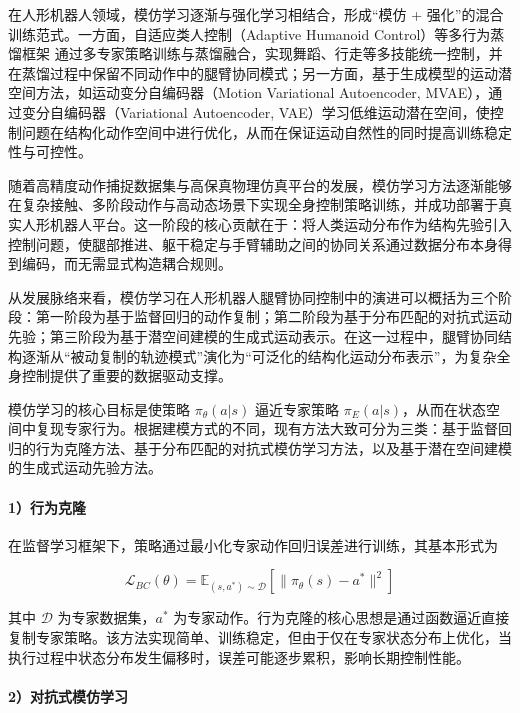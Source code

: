 在人形机器人领域，模仿学习逐渐与强化学习相结合，形成“模仿 + 强化”的混合训练范式。一方面，自适应类人控制（Adaptive Humanoid Control）等多行为蒸馏框架 \cite{MOE} 通过多专家策略训练与蒸馏融合，实现舞蹈、行走等多技能统一控制，并在蒸馏过程中保留不同动作中的腿臂协同模式；另一方面，基于生成模型的运动潜空间方法，如运动变分自编码器（Motion Variational Autoencoder, MVAE）\cite{MVAE}，通过变分自编码器（Variational Autoencoder, VAE）学习低维运动潜在空间，使控制问题在结构化动作空间中进行优化，从而在保证运动自然性的同时提高训练稳定性与可控性。

随着高精度动作捕捉数据集与高保真物理仿真平台的发展，模仿学习方法逐渐能够在复杂接触、多阶段动作与高动态场景下实现全身控制策略训练，并成功部署于真实人形机器人平台。这一阶段的核心贡献在于：将人类运动分布作为结构先验引入控制问题，使腿部推进、躯干稳定与手臂辅助之间的协同关系通过数据分布本身得到编码，而无需显式构造耦合规则。

从发展脉络来看，模仿学习在人形机器人腿臂协同控制中的演进可以概括为三个阶段：第一阶段为基于监督回归的动作复制；第二阶段为基于分布匹配的对抗式运动先验；第三阶段为基于潜空间建模的生成式运动表示。在这一过程中，腿臂协同结构逐渐从“被动复制的轨迹模式”演化为“可泛化的结构化运动分布表示”，为复杂全身控制提供了重要的数据驱动支撑。

模仿学习的核心目标是使策略 $\pi_\theta(a|s)$ 逼近专家策略 $\pi_E(a|s)$，从而在状态空间中复现专家行为。根据建模方式的不同，现有方法大致可分为三类：基于监督回归的行为克隆方法、基于分布匹配的对抗式模仿学习方法，以及基于潜在空间建模的生成式运动先验方法。

\paragraph{1）行为克隆}

在监督学习框架下，策略通过最小化专家动作回归误差进行训练，其基本形式为

\begin{equation}
	\mathcal{L}_{BC}(\theta) =
	\mathbb{E}_{(s,a^*) \sim \mathcal{D}}
	\left[
	\| \pi_\theta(s) - a^* \|^2
	\right]
\end{equation}

其中 $\mathcal{D}$ 为专家数据集，$a^*$ 为专家动作。行为克隆的核心思想是通过函数逼近直接复制专家策略。该方法实现简单、训练稳定，但由于仅在专家状态分布上优化，当执行过程中状态分布发生偏移时，误差可能逐步累积，影响长期控制性能。

\paragraph{2）对抗式模仿学习}

